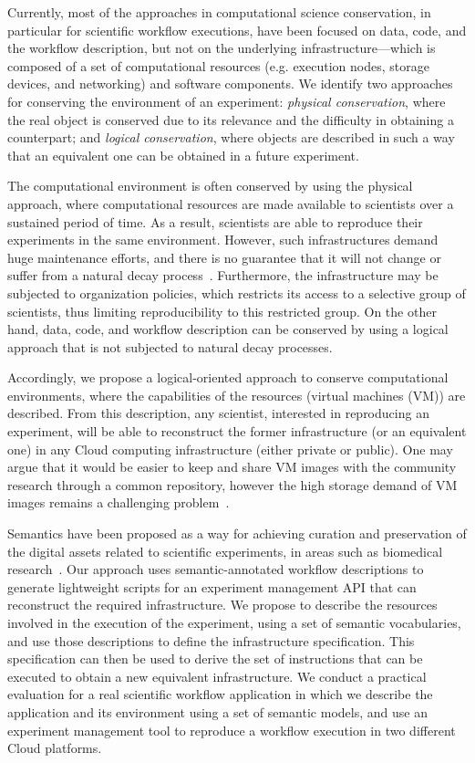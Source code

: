 Currently, most of the approaches in computational science conservation, in particular for scientific workflow executions, have been focused on data, code, and the workflow description, but not on the underlying infrastructure---which is composed of a set of computational resources (e.g. execution nodes, storage devices, and networking) and software components. We identify two approaches for conserving the environment of an experiment: \emph{physical conservation}, where the real object is conserved due to its relevance and the difficulty in obtaining a counterpart; and \emph{logical conservation}, where objects are described in such a way that an equivalent one can be obtained in a future experiment.

The computational environment is often conserved by using the physical approach, where computational resources are made available to scientists over a sustained period of time. As a result, scientists are able to reproduce their experiments in the same environment. However, such infrastructures demand huge maintenance efforts, and there is no guarantee that it will not change or suffer from a natural decay process~\cite{Gavish2011637}. Furthermore, the infrastructure may be subjected to organization policies, which restricts its access to a selective group of scientists, thus limiting reproducibility to this restricted group. On the other hand, data, code, and workflow description can be conserved by using a logical approach that is not subjected to natural decay processes. 

Accordingly, we propose a logical-oriented approach to conserve computational environments, where the capabilities of the resources (virtual machines (VM)) are described. From this description, any scientist, interested in reproducing an experiment, will be able to reconstruct the former infrastructure (or an equivalent one) in any Cloud computing infrastructure (either private or public). One may argue that it would be easier to keep and share VM images with the community research through a common repository, however the high storage demand of VM images remains a challenging problem~\cite{Mao:2014:ROD:2600090.2512348,6552826}. 

Semantics have been proposed as a way for achieving curation and preservation of the digital assets related to scientific experiments, in areas such as biomedical research~\cite{MaloneSWO2014}. Our approach uses semantic-annotated workflow descriptions to generate lightweight scripts for an experiment management API that can reconstruct the required infrastructure. We propose to describe the resources involved in the execution of the experiment, using a set of semantic vocabularies, and use those descriptions to define the infrastructure specification. This specification can then be used to derive the set of instructions that can be executed to obtain a new equivalent infrastructure. We conduct a practical evaluation for a real scientific workflow application in which we describe the application and its environment using a set of semantic models, and use an experiment management tool to reproduce a workflow execution in two different Cloud platforms. 

